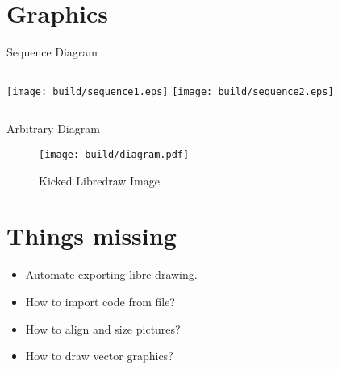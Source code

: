 \documentclass{beamer}
\begin{document}
\section{Graphics}

\begin{frame}{Sequence Diagram}
    \begin{columns}
            \centering
            \texttt{[image: build/sequence1.eps]}
            \centering
            \texttt{[image: build/sequence2.eps]}
    \end{columns}
\end{frame}

\begin{frame}{Arbitrary Diagram}
    \begin{figure}[p]
        \centering
        \texttt{[image: build/diagram.pdf]}
        \caption{Kicked Libredraw Image}
    \end{figure}
\end{frame}

\section{Things missing}

\begin{frame}
    \begin{itemize}
        \item Automate exporting libre drawing.
        \item How to import code from file?
        \item How to align and size pictures?
        \item How to draw vector graphics?
    \end{itemize}
\end{frame}
\end{document}
